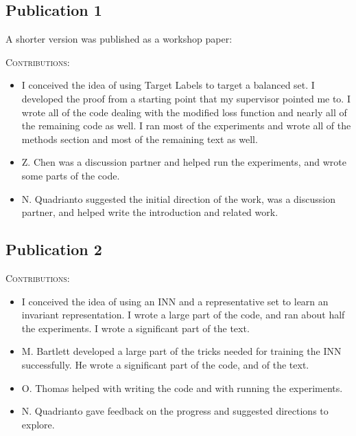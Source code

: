 \subsection{Publication 1}
\begin{refsection}[allreferences]
    \nocite{kehrenberg2020tuning}
    \printbibliography[heading=none]
\end{refsection}
\noindent A shorter version was published as a workshop paper:
\begin{refsection}[allreferences]
    \nocite{kehrenberg2018interpretable}
    \printbibliography[heading=none]
\end{refsection}
\noindent\textsc{Contributions:}
\begin{itemize}
  \item I conceived the idea of using Target Labels to target a balanced set.
    I developed the proof from a starting point that my supervisor pointed me to.
    I wrote all of the code dealing with the modified loss function and nearly all of the remaining code as well.
    I ran most of the experiments and wrote all of the methods section and most of the remaining text as well.
  \item Z. Chen was a discussion partner and helped run the experiments, and wrote some parts of the code.
  \item N. Quadrianto suggested the initial direction of the work, was a discussion partner,
    and helped write the introduction and related work.
\end{itemize}

\subsection{Publication 2}
\begin{refsection}[allreferences]
    \nocite{kehrenberg2020nullsampling}
    \printbibliography[heading=none]
\end{refsection}%
\noindent\textsc{Contributions:}
\begin{itemize}
  \item I conceived the idea of using an \acf{INN} and a representative set to learn an invariant representation.
    I wrote a large part of the code, and ran about half the experiments. I wrote a significant part of the text.
  \item M. Bartlett developed a large part of the tricks needed for training the \ac{INN} successfully.
    He wrote a significant part of the code, and of the text.
  \item O. Thomas helped with writing the code and with running the experiments.
  \item N. Quadrianto gave feedback on the progress and suggested directions to explore.
\end{itemize}


